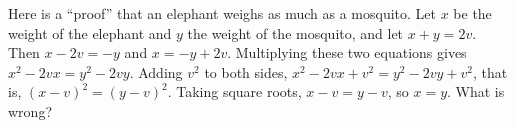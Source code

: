 Here is a ``proof'' that an elephant weighs as much as a mosquito. Let $x$ be the weight of the elephant and $y$ the weight of the mosquito, and let $x+y=2v$. Then $x-2v=-y$ and $x=-y+2v$. Multiplying these two equations gives $x^2-2vx=y^2-2vy$. Adding $v^2$ to both sides, $x^2-2vx+v^2=y^2-2vy+v^2$, that is, $(x-v)^2=(y-v)^2$. Taking square roots, $x-v=y-v$, so $x=y$. What is wrong?
